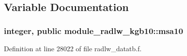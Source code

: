 \subsection{Variable Documentation}
\subsubsection[{\texorpdfstring{msa10}{msa10}}]{\setlength{\rightskip}{0pt plus 5cm}integer, public module\+\_\+radlw\+\_\+kgb10\+::msa10}\hypertarget{namespacemodule__radlw__kgb10_a2305b922082d1cc367276b636f09fb6c}{}\label{namespacemodule__radlw__kgb10_a2305b922082d1cc367276b636f09fb6c}


Definition at line 28022 of file radlw\+\_\+datatb.\+f.

